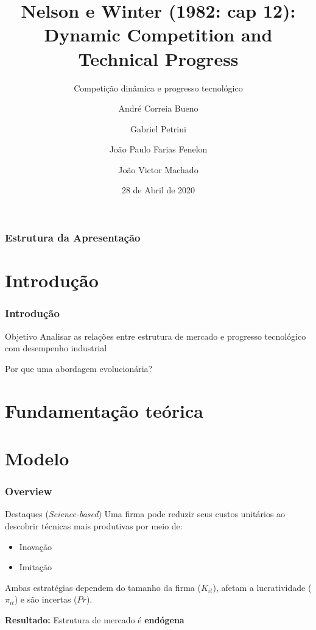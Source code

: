 \documentclass[12pt]{beamer}
\begin{document}
	\author{
		André Correia Bueno \and
		Gabriel Petrini		\\\and
		João Paulo Farias Fenelon \and
		João Victor Machado
	}
	\title{Nelson e Winter (1982: cap 12): Dynamic Competition and Technical
		Progress}
	\subtitle{Competição dinâmica e progresso tecnológico}
	\date{28 de Abril de 2020}
	\subject{OIDT}



\begin{frame}[plain]
	\maketitle
\end{frame}

\begin{frame}
\frametitle{Estrutura da Apresentação}
\tableofcontents
\end{frame}

\section{Introdução}

\begin{frame}
\frametitle{Introdução}
\begin{alert}{Objetivo}
	Analisar as relações entre estrutura de mercado e progresso tecnológico com desempenho industrial
\end{alert}


\begin{alert}{Por que uma abordagem evolucionária?}

\end{alert}

\end{frame}

\section{Fundamentação teórica}

\section{Modelo}

\begin{frame}
\frametitle{Overview}
\begin{alert}{Destaques (\textit{Science-based})}
	Uma firma pode reduzir seus custos unitários ao descobrir técnicas mais produtivas por meio de:
	
	\begin{itemize}
		\item Inovação
		\item Imitação
	\end{itemize}
	
	Ambas estratégias dependem do tamanho da firma ($K_{it}$), afetam a lucratividade ($\pi_{it}$) e são incertas ($Pr$). 
\end{alert}

\textbf{Resultado:} Estrutura de mercado é \textbf{endógena}
\end{frame}
\end{document}
